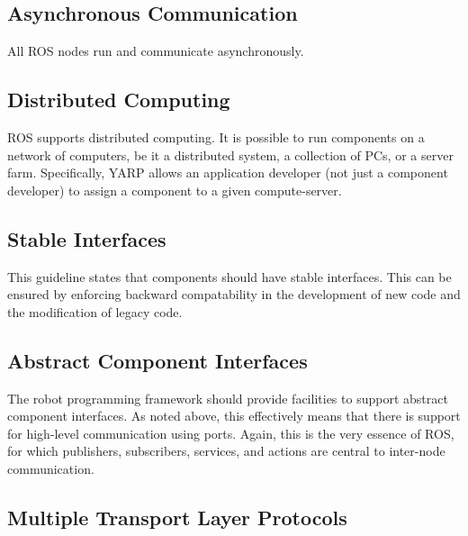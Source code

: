 \documentclass{CSSRforAfrica}
\begin{document}
\subsection{Asynchronous Communication} 

All ROS nodes run and communicate {asynchronously.}

\subsection{Distributed Computing}

ROS supports distributed computing.  It is possible to run components on a network of computers, be it a distributed system, a collection of PCs, or a server farm.  Specifically, YARP allows an application developer (not just a component developer) to assign a component to a given compute-server.  

 

\subsection{Stable Interfaces}

This guideline states that components should have {stable interfaces}. This can be ensured by enforcing backward compatability in the development of new code and the modification of legacy code.


\subsection{Abstract Component Interfaces}

The robot programming framework should provide facilities to support {abstract component interfaces}.  As noted above, this effectively  means that there is support for high-level communication using ports.  Again, this is the very essence of ROS, for which publishers, subscribers, services, and actions are central to inter-node communication. 

\subsection{Multiple Transport Layer Protocols}
\end{document}
